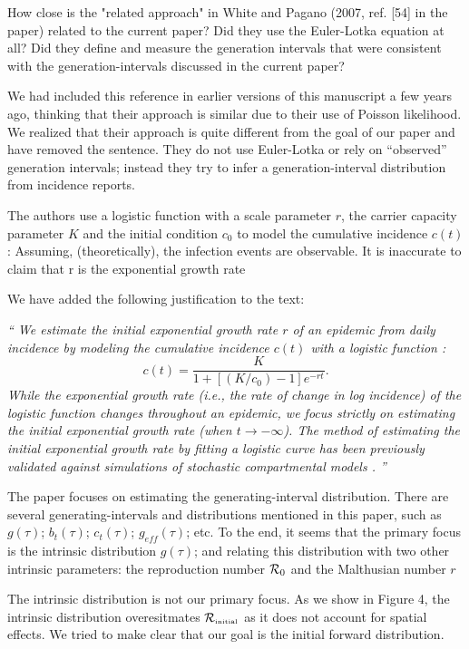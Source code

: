 \documentclass[12pt]{article}
\newcommand{\Rx}[1]{\ensuremath{{\cal R}_{#1}}}
\newcommand{\Ro}{\Rx{0}}
\newcommand{\Rini}{\Rx{\textrm{\tiny initial}}}
\newcommand{\revtext}{\textsf}
\newcommand{\newtext}[1]{\textsl{``#1''}}
\begin{document}
\revtext{
How close is the "related approach" in White and Pagano
(2007, ref. [54] in the paper) related to the current paper? Did they use the
Euler-Lotka equation at all? Did they define and measure the generation intervals that were consistent with the generation-intervals discussed in
the current paper?
}

We had included this reference in earlier versions of this manuscript a few years ago, thinking that their approach is similar due to their use of Poisson likelihood.
We realized that their approach is quite different from the goal of our paper and have removed the sentence.
They do not use Euler-Lotka or rely on ``observed'' generation intervals;
instead they try to infer a generation-interval distribution from incidence reports.

\revtext{
The authors use a logistic function with a scale parameter $r$,
the carrier capacity parameter $K$ and the initial condition $c_0$ to model the
cumulative incidence $c(t)$: Assuming, (theoretically), the infection events
are observable. It is inaccurate to claim that r is the exponential growth
rate
}

We have added the following justification to the text:

\newtext{
We estimate the initial exponential growth rate $r$ of an epidemic from daily incidence by modeling the cumulative incidence $c(t)$ with a logistic function \citep{ma2014estimating}:
\begin{equation}
c(t) = \frac{K}{1 + \left[(K/c_0)-1\right]e^{-rt}}.
\end{equation}
While the exponential growth rate (i.e., the rate of change in log incidence) of the logistic function changes throughout an epidemic,
we focus strictly on estimating the \emph{initial} exponential growth rate (when $t \to -\infty$).
The method of estimating the initial exponential growth rate by fitting a logistic curve has been previously validated against simulations of stochastic compartmental models \citep{ma2014estimating}.
}

\revtext{
The paper focuses on estimating the generating-interval distribution. There are
several generating-intervals and distributions mentioned in this paper, such as
$g(\tau)$; $b_t(\tau)$; $c_t(\tau)$; $g_{eff}(\tau)$; etc. To the end, it seems that the primary focus is the
intrinsic distribution $g(\tau)$; and relating this distribution with two other intrinsic
parameters: the reproduction number $\Ro$ and the Malthusian number $r$
}

The intrinsic distribution is not our primary focus. 
As we show in Figure 4, the intrinsic distribution overesitmates $\Rini$ as it does not account for spatial effects.
We tried to make clear that our goal is the initial forward distribution.
\end{document}
